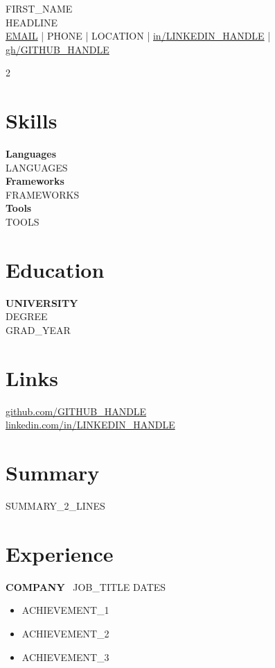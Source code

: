\documentclass[10pt,a4paper]{article}
\begin{document}
\begin{center}
  {\Huge {{FIRST_NAME}} {\bfseries{}}}\\[3pt]
  {\small\color{gray} {{HEADLINE}}}\\[4pt]
  {\footnotesize
    \href{mailto:{{EMAIL}}}{{{EMAIL}}} | {{PHONE}} | {{LOCATION}} |
    \href{https://linkedin.com/in/{{LINKEDIN_HANDLE}}}{in/{{LINKEDIN_HANDLE}}} |
    \href{https://github.com/{{GITHUB_HANDLE}}}{gh/{{GITHUB_HANDLE}}}}
\end{center}

\begin{paracol}{2}

\section{Skills}
\textbf{Languages}\\ {{LANGUAGES}}\\[4pt]
\textbf{Frameworks}\\ {{FRAMEWORKS}}\\[4pt]
\textbf{Tools}\\ {{TOOLS}}

\section{Education}
\textbf{{{UNIVERSITY}}}\\
{\small {{DEGREE}}}\\
{\small\color{gray} {{GRAD_YEAR}}}

\section{Links}
\href{https://github.com/{{GITHUB_HANDLE}}}{github.com/{{GITHUB_HANDLE}}}\\
\href{https://linkedin.com/in/{{LINKEDIN_HANDLE}}}{linkedin.com/in/{{LINKEDIN_HANDLE}}}

\switchcolumn

\section{Summary}
{{SUMMARY_2_LINES}}

\section{Experience}
\textbf{{{COMPANY}}} \textbar\ {{JOB_TITLE}} \hfill {\color{gray}\small {{DATES}}}
\begin{itemize}[leftmargin=*,nosep,itemsep=2pt]
  \item {{ACHIEVEMENT_1}}
  \item {{ACHIEVEMENT_2}}
  \item {{ACHIEVEMENT_3}}
\end{itemize}


\end{paracol}
\end{document}
